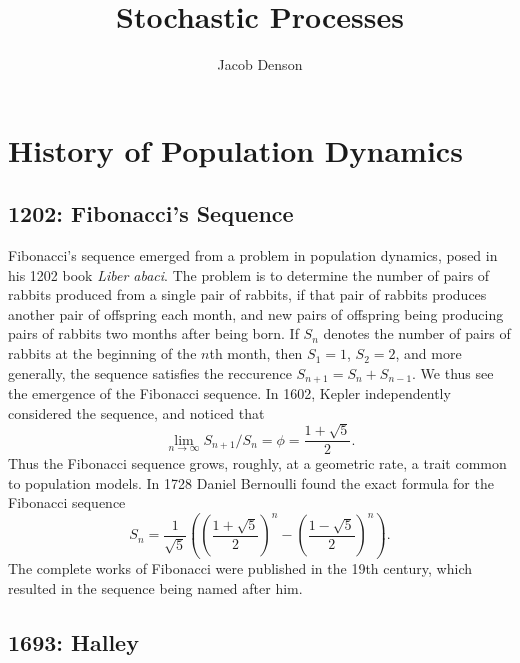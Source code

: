 

\title{Stochastic Processes}
\author{Jacob Denson}



\maketitle
\tableofcontents

\newpage

\chapter{History of Population Dynamics}

\section{1202: Fibonacci's Sequence}

Fibonacci's sequence emerged from a problem in population dynamics, posed in his 1202 book \emph{Liber abaci}. The problem is to determine the number of pairs of rabbits produced from a single pair of rabbits, if that pair of rabbits produces another pair of offspring each month, and new pairs of offspring being producing pairs of rabbits two months after being born. If $S_n$ denotes the number of pairs of rabbits at the beginning of the $n$th month, then $S_1 = 1$, $S_2 = 2$, and more generally, the sequence satisfies the reccurence $S_{n+1} = S_n + S_{n-1}$. We thus see the emergence of the Fibonacci sequence. In 1602, Kepler independently considered the sequence, and noticed that
%
\[ \lim_{n \to \infty} S_{n+1} / S_n = \phi = \frac{1 + \sqrt{5}}{2}. \]
%
Thus the Fibonacci sequence grows, roughly, at a geometric rate, a trait common to population models. In 1728 Daniel Bernoulli found the exact formula for the Fibonacci sequence
%
\[ S_n = \frac{1}{\sqrt{5}} \left( \left( \frac{1 + \sqrt{5}}{2} \right)^n - \left( \frac{1 - \sqrt{5}}{2} \right)^n \right). \]
%
The complete works of Fibonacci were published in the 19th century, which resulted in the sequence being named after him.

\section{1693: Halley}

